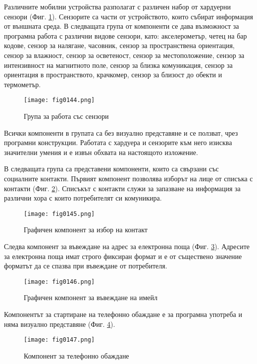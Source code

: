 Различните мобилни устройства разполагат с различен набор от хардуерни сензори (Фиг. \ref{fig0144}). Сензорите са части от устройството, които събират информация от външната среда. В следващата група от компоненти се дава възможност за програмна работа с различни видове сензори, като: акселерометър, четец на бар кодове, сензор за налягане, часовник, сензор за пространствена ориентация, сензор за влажност, сензор за осветеност, сензор за местоположение, сензор за интензивност на магнитното поле, сензор за близка комуникация, сензор за ориентация в пространството, крачкомер, сензор за близост до обекти и термометър.

\begin{figure}[H]
  \centering
  \texttt{[image: fig0144.png]}
  \caption{Група за работа със сензори}
\label{fig0144}
\end{figure}

Всички компоненти в групата са без визуално представяне и се ползват, чрез програмни конструкции. Работата с хардуера и сензорите към него изисква значителни умения и е извън обхвата на настоящото изложение. 

В следващата група са представени компоненти, които са свързани със социалните контакти. Първият компонент позволява изборът на лице от списъка с контакти (Фиг. \ref{fig0145}). Списъкът с контакти служи за запазване на информация за различни хора с които потребителят си комуникира.

\begin{figure}[H]
  \centering
  \texttt{[image: fig0145.png]}
  \caption{Графичен компонент за избор на контакт}
\label{fig0145}
\end{figure}

Следва компонент за въвеждане на адрес за електронна поща (Фиг. \ref{fig0146}). Адресите за електронна поща имат строго фиксиран формат и е от съществено значение форматът да се спазва при въвеждане от потребителя. 

\begin{figure}[H]
  \centering
  \texttt{[image: fig0146.png]}
  \caption{Графичен компонент за въвеждане на имейл}
\label{fig0146}
\end{figure}

Компонентът за стартиране на телефонно обаждане е за програмна употреба и няма визуално представяне (Фиг. \ref{fig0147}).

\begin{figure}[H]
  \centering
  \texttt{[image: fig0147.png]}
  \caption{Компонент за телефонно обаждане}
\label{fig0147}
\end{figure}

